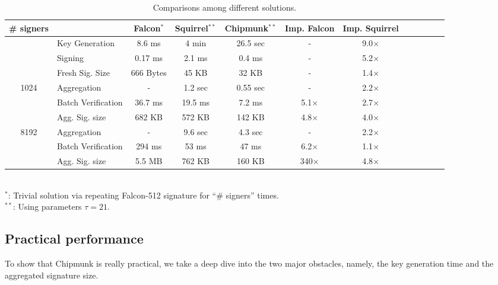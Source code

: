 \begin{table}\centering
  \begin{tabular}{|c||l|c|c|c||c|c|c|c||c|c|c|}\hline
    \# signers      &                 & Falcon$^{*}$& Squirrel$^{**}$  & Chipmunk$^{**}$  & Imp. Falcon & Imp. Squirrel \\\hline\hline
    \multirow{2}{*}{} 
                    & Key Generation  & 8.6 ms      & 4 min     & 26.5 sec  &     -       & 9.0$\times$ \\\cline{2-7}
                    & Signing         & 0.17 ms     & 2.1 ms    & 0.4 ms    &     -       & 5.2$\times$ \\\cline{2-7}
                    &Fresh Sig. Size  & 666 Bytes   & 45 KB     & 32 KB     &     -       & 1.4$\times$ \\\hline\hline
    \multirow{3}{*}{1024}                
                    &Aggregation      & -           & 1.2 sec   & 0.55 sec  &     -       & 2.2$\times$ \\\cline{2-7}
                    &Batch Verification    
                                      & 36.7 ms     & 19.5 ms   & 7.2 ms    & 5.1$\times$ & 2.7$\times$ \\\cline{2-7}
                    
                    &Agg. Sig. size   & 682 KB      & 572 KB    & 142 KB    & 4.8$\times$ & 4.0$\times$ \\\hline\hline
    \multirow{3}{*}{8192}                
                    &Aggregation      & -           & 9.6 sec   & 4.3 sec   &     -       & 2.2$\times$ \\\cline{2-7}
                    &Batch Verification    
                                      & 294 ms      & 53  ms    &  47 ms    & 6.2$\times$ & 1.1$\times$ \\\cline{2-7}
                    &Agg. Sig. size   & 5.5 MB      & 762 KB    & 160 KB    & 340$\times$ & 4.8$\times$ \\\hline
\end{tabular}\\
  $^{*}$: Trivial solution via repeating Falcon-512 signature for ``\# signers'' times.\\
  $^{**}$: Using parameters $\tau=21$.
  \caption{Comparisons among different solutions.}
\end{table}

\subsection{Practical performance}
To show that Chipmunk is really practical, 
we take a deep dive into the two major obstacles, namely, the key generation time and the aggregated signature size.

